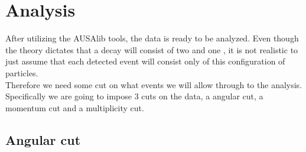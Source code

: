 \chapter{Analysis}
After utilizing the AUSAlib tools, the data is ready to be analyzed. Even though the theory dictates that a decay will consist of two \aps and one \bp, it is not realistic to just assume that each detected event will consist only of this configuration of particles. \\
Therefore we need some cut on what events we will allow through to the analysis. Specifically we are going to impose 3 cuts on the data, a angular cut, a momentum cut and a multiplicity cut.


\section{Angular cut}
